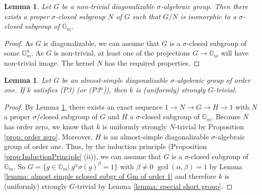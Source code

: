 \documentclass[oneside,reqno]{amsart}
\newtheorem{lemma}[theo]{Lemma}
\theoremstyle{definition}
\newcommand{\s}{\sigma}
\newcommand{\Gm}{\mathbb{G}_m}
\newcommand{\ZZ}{\mathbb{Z}}
\newcommand{\pt}{{\rm{(P3$^u$)}}}
\newcommand{\ptweak}{{\rm{(P3)}}}
\begin{document}
\begin{lemma} \label{lemma: get into Gm}
	Let $G$ be a non-trivial diagonalizable $\s$-algebraic group. Then there exists a proper $\s$-closed subgroup $N$ of $G$ such that $G/N$ is isomorphic to a $\s$-closed subgroup of $\Gm$.
\end{lemma}
\begin{proof}
	As $G$ is diagonalizable, we can assume that $G$ is a $\s$-closed subgroup of some $\Gm^n$. As $G$ is non-trivial, at least one of the projections $G\to\Gm$ will have non-trivial image. The kernel $N$ has the required properties.
\end{proof}	



\begin{lemma} \label{lemma: proof for almostsimple diagonalizable order one}
	Let $G$ be an almost-simple diagonalizable $\s$-algebraic group of order one. If $k$ satisfies \ptweak{} (or \pt{}), then 
	$k$ is (uniformly) strongly $G$-trivial.
\end{lemma}	
\begin{proof}
	By Lemma \ref{lemma: get into Gm}, there exists an exact sequence
	$1\to N\to G\to H\to 1$ with $N$ a proper $\s$\=/closed subgroup of $G$ and $H$ a $\s$-closed subgroup of $\Gm$. Because $N$ has order zero, we know that $k$ is uniformly strongly $N$-trivial by Proposition \ref{prop: order zero}. Moreover, $H$ is an almost-simple diagonalizable $\s$-algebraic group of order one. Thus, by the induction principle (Proposition \ref{prop:InductionPrinciple} (ii)), we can assume that $G$ is a $\s$-closed subgroup of $\Gm$. So $G=\{g\in\Gm|\ g^{\alpha}\s(g)^{\beta}=1\}$ with $\beta\neq 0$ $\gcd(\alpha,\beta)=1$ by Lemma \ref{lemma: almost simple sclosed subgr of Gm of order 1} and therefore $k$ is (uniformly) strongly $G$-trivial by Lemma \ref{lemma: special short group}.
\end{proof}	
\end{document}
